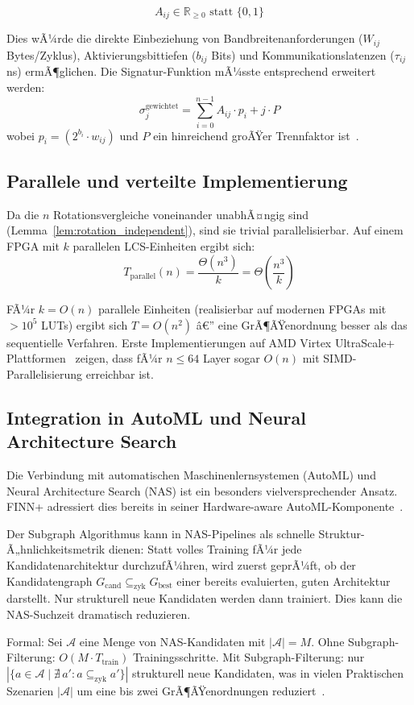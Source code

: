 ﻿\documentclass[a4paper,12pt]{article}
\theoremstyle{definition}
\begin{document}
\[
    A_{ij} \in \mathbb{R}_{\geq 0} \text{ statt } \{0,1\}
\]

Dies wÃ¼rde die direkte Einbeziehung von Bandbreitenanforderungen ($W_{ij}$ Bytes/Zyklus),
Aktivierungsbittiefen ($b_{ij}$ Bits) und Kommunikationslatenzen ($\tau_{ij}$ ns) ermÃ¶glichen.
Die Signatur-Funktion mÃ¼sste entsprechend erweitert werden:
\[
    \sigma_j^{\text{gewichtet}} = \sum_{i=0}^{n-1} A_{ij} \cdot p_i + j \cdot P
\]
wobei $p_i = (2^{b_i} \cdot w_{ij})$ und $P$ ein hinreichend groÃŸer Trennfaktor ist~\cite{epp2026a}.

\subsection{Parallele und verteilte Implementierung}

Da die $n$ Rotationsvergleiche voneinander unabhÃ¤ngig sind (Lemma~\ref{lem:rotation_independent}),
sind sie trivial parallelisierbar. Auf einem FPGA mit $k$ parallelen LCS-Einheiten ergibt sich:
\[
    T_{\text{parallel}}(n) = \frac{\Theta(n^3)}{k} = \Theta\!\left(\frac{n^3}{k}\right)
\]

FÃ¼r $k = O(n)$ parallele Einheiten (realisierbar auf modernen FPGAs mit $>10^5$ LUTs)
ergibt sich $T = O(n^2)$ â€” eine GrÃ¶ÃŸenordnung besser als das sequentielle Verfahren.
Erste Implementierungen auf AMD Virtex UltraScale+ Plattformen~\cite{jentzsch2025} zeigen,
dass fÃ¼r $n \leq 64$ Layer sogar $O(n)$ mit SIMD-Parallelisierung erreichbar ist.

\subsection{Integration in AutoML und Neural Architecture Search}

Die Verbindung mit automatischen Maschinenlernsystemen (AutoML) und Neural Architecture
Search (NAS) ist ein besonders vielversprechender Ansatz. FINN+ adressiert dies bereits
in seiner Hardware-aware AutoML-Komponente~\cite{jentzsch2025}.

Der Subgraph Algorithmus kann in NAS-Pipelines als schnelle Struktur-Ã„hnlichkeitsmetrik
dienen: Statt volles Training fÃ¼r jede Kandidatenarchitektur durchzufÃ¼hren, wird zuerst
geprÃ¼ft, ob der Kandidatengraph $G_{\text{cand}} \subseteq_{\text{zyk}} G_{\text{best}}$
einer bereits evaluierten, guten Architektur darstellt. Nur strukturell neue Kandidaten
werden dann trainiert. Dies kann die NAS-Suchzeit dramatisch reduzieren.

Formal: Sei $\mathcal{A}$ eine Menge von NAS-Kandidaten mit $|\mathcal{A}| = M$.
Ohne Subgraph-Filterung: $O(M \cdot T_{\text{train}})$ Trainingsschritte.
Mit Subgraph-Filterung: nur $|\{a \in \mathcal{A} \mid \nexists\, a' : a \subseteq_{\text{zyk}} a'\}|$
strukturell neue Kandidaten, was in vielen Praktischen Szenarien $|\mathcal{A}|$
um eine bis zwei GrÃ¶ÃŸenordnungen reduziert~\cite{zoph2016}.
\end{document}
